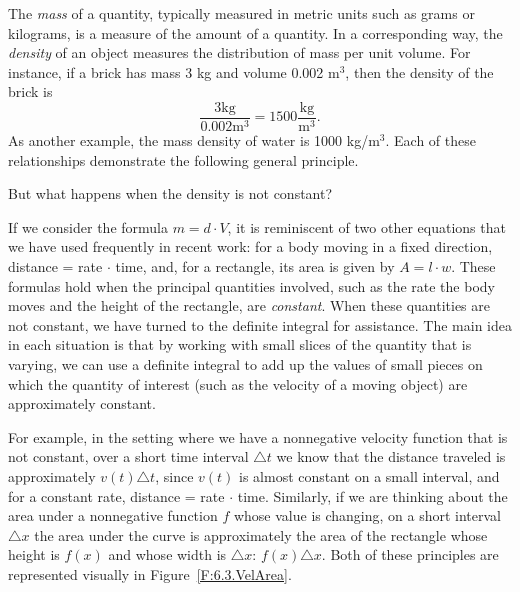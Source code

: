 The \emph{mass}  of a quantity, typically measured in metric units such as grams or kilograms, is a measure of the amount of a quantity.  In a corresponding way, the \emph{density} of an object measures the distribution of mass per unit volume.  For instance, if a brick has mass 3 kg and volume 0.002 m$^3$, then the density of the brick is 
$$\frac{3 \mbox{kg}}{0.002 \mbox{m}^3} = 1500 \frac{\mbox{kg}}{\mbox{m}^3}.$$
As another example, the mass density of water is 1000 kg/m$^3$.  Each of these relationships demonstrate the following general principle.  

\vspace*{5pt}
\nin {}
\vspace*{1pt}

But what happens when the density is not constant?

If we consider the formula $m = d \cdot V$, it is reminiscent of two other equations that we have used frequently in recent work:  for a body moving in a fixed direction, distance = rate $\cdot$ time, and, for a rectangle, its area is given by $A = l \cdot w$.  These formulas hold when the principal quantities involved, such as the rate the body moves and the height of the rectangle, are \emph{constant}.  When these quantities are not constant, we have turned to the definite integral for assistance.  The main idea in each situation is that by working with small slices of the quantity that is varying, we can use a definite integral to add up the values of small pieces on which the quantity of interest (such as the velocity of a moving object) are approximately constant.

For example, in the setting where we have a nonnegative velocity function that is not constant, over a short time interval $\triangle t$ we know that the distance traveled is approximately $v(t) \triangle t$, since $v(t)$ is almost constant on a small interval, and for a constant rate, distance = rate $\cdot$ time.  Similarly, if we are thinking about the area under a nonnegative function $f$ whose value is changing, on a short interval $\triangle x$ the area under the curve is approximately the area of the rectangle whose height is $f(x)$ and whose width is $\triangle x$:  $f(x) \triangle x$.  Both of these principles are represented visually in Figure~\ref{F:6.3.VelArea}.  

